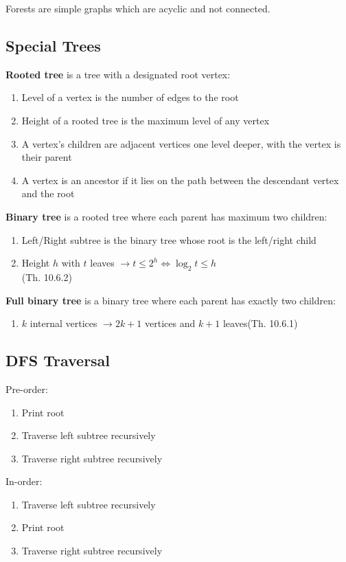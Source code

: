 \documentclass[12pt, a4paper]{article}
\begin{document}
\begin{multicols*}{3}
Forests are simple graphs which are acyclic and not connected.

\subsection{Special Trees}
\textbf{Rooted tree} is a tree with a designated root vertex:
\begin{enumerate}[\roman*.]
  \item Level of a vertex is the number of edges to the root 
  \item Height of a rooted tree is the maximum level of any vertex
  \item A vertex's children are adjacent vertices one level deeper, with the vertex is their parent
  \item A vertex is an ancestor if it lies on the path between the descendant vertex and the root
\end{enumerate}

\textbf{Binary tree} is a rooted tree where each parent has maximum two children:
\begin{enumerate}[\roman*.]
  \item Left/Right subtree is the binary tree whose root is the left/right child
  \item Height $h$ with $t$ leaves $\rightarrow t \leq 2^h \iff \log_2t \leq h$\\\hfill(Th. 10.6.2)
\end{enumerate}
\textbf{Full binary tree} is a binary tree where each parent has exactly two children:
\begin{enumerate}[\roman*.]
  \item $k$ internal vertices $\rightarrow 2k+1$ vertices and $k+1$ leaves\hfill(Th. 10.6.1) 
\end{enumerate}
\colbreak

\subsection{DFS Traversal}
Pre-order:
\begin{enumerate}[\roman*.]
  \item Print root
  \item Traverse left subtree recursively
  \item Traverse right subtree recursively
\end{enumerate}

In-order:
\begin{enumerate}[\roman*.]
  \item Traverse left subtree recursively
  \item Print root
  \item Traverse right subtree recursively
\end{enumerate}


\end{multicols*}
\end{document}
